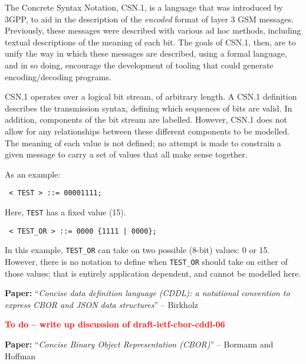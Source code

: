 \documentclass[10pt,a4paper]{article}
\newcommand{\todo}[1]{\textbf{\textcolor{red}{To do -- #1}}}
\newcommand{\paper}[3]{\vspace{4mm}\noindent\textbf{Paper:} ``\textit{#1}'' -- #2 \cite{#3}\vspace{3mm}}
\begin{document}
The Concrete Syntax Notation, CSN.1, is a language that was introduced by 3GPP, to aid in
the description of the \emph{encoded} format of layer 3 GSM messages. Previously, these
messages were described with various ad hoc methods, including textual descriptions of the
meaning of each bit. The goals of CSN.1, then, are to unify the way in which these
messages are described, using a formal language, and in so doing, encourage the
development of tooling that could generate encoding/decoding programs.

CSN.1 operates over a logical bit stream, of arbitrary length. A CSN.1 definition
describes the transmission syntax, defining which sequences of bits are valid. In
addition, components of the bit stream are labelled. However, CSN.1 does not allow for any
relationships between these different components to be modelled. The meaning of each value
is not defined; no attempt is made to constrain a given message to carry a set of values
that all make sense together.

As an example:

\begin{verbatim} < TEST > ::= 00001111; \end{verbatim}

Here, \texttt{TEST} has a fixed value (15).

\begin{verbatim} < TEST_OR > ::= 0000 {1111 | 0000}; \end{verbatim}

In this example, \texttt{TEST\_OR} can take on two possible (8-bit) values: 0 or 15.
However, there is no notation to define when \texttt{TEST\_OR} should take on either of
those values: that is entirely application dependent, and cannot be modelled here.

\paper{Concise data definition language (CDDL): a notational convention to
       express CBOR and JSON data structures}{Birkholz}{draft-ietf-cbor-cddl-06}

\todo{write up discussion of draft-ietf-cbor-cddl-06}

\paper{Concise Binary Object Representation (CBOR)}{Bormann and Hoffman}{rfc7049}
\end{document}
